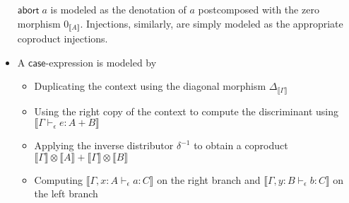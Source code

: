 \documentclass[acmsmall,screen,review]{acmart}
\newcommand{\ms}[1]{\ensuremath{\mathsf{#1}}}
\newcommand{\hasty}[4]{#1 \vdash_{#2} #3: {#4}}
\newcommand{\dnt}[1]{\llbracket{#1}\rrbracket}
\begin{document}
\begin{itemize}
  $\ms{abort}\;a$ is modeled as the denotation of $a$ postcomposed with the zero morphism 
  $0_{\dnt{A}}$. Injections, similarly, are simply modeled as the appropriate coproduct injections.
  \item A \ms{case}-expression is modeled by
  \begin{itemize}
    \item Duplicating the context using the diagonal morphism $\Delta_{\dnt{\Gamma}}$
    \item Using the right copy of the context to compute the discriminant using
          $\dnt{\hasty{\Gamma}{\epsilon}{e}{A + B}}$
    \item Applying the inverse distributor $\delta^{-1}$ to obtain a coproduct
          $\dnt{\Gamma} \otimes \dnt{A} + \dnt{\Gamma} \otimes \dnt{B}$
    \item Computing $\dnt{\hasty{\Gamma, x: A}{\epsilon}{a}{C}}$ on the right
          branch and $\dnt{\hasty{\Gamma, y: B}{\epsilon}{b}{C}}$ on the left branch
  \end{itemize}
\end{itemize}
\end{document}
